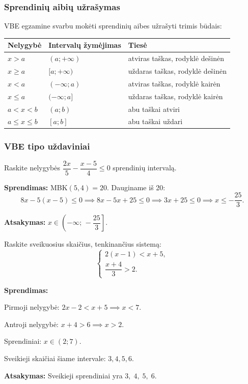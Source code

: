\subsubsection{Sprendinių aibių užrašymas}

VBE egzamine svarbu mokėti sprendinių aibes užrašyti trimis būdais:

\begin{center}
\begin{tabular}{|l|l|l|}
\hline
\textbf{Nelygybė} & \textbf{Intervalų žymėjimas} & \textbf{Tiesė} \\
\hline
$x > a$ & $(a; +\infty)$ & atviras taškas, rodyklė dešinėn \\
$x \geq a$ & $[a; +\infty)$ & uždaras taškas, rodyklė dešinėn \\
$x < a$ & $(-\infty; a)$ & atviras taškas, rodyklė kairėn \\
$x \leq a$ & $(-\infty; a]$ & uždaras taškas, rodyklė kairėn \\
$a < x < b$ & $(a; b)$ & abu taškai atviri \\
$a \leq x \leq b$ & $[a; b]$ & abu taškai uždari \\
\hline
\end{tabular}
\end{center}

\subsubsection{VBE tipo uždaviniai}

\begin{exercise}
Raskite nelygybės $\dfrac{2x}{5} - \dfrac{x - 5}{4} \leq 0$ sprendinių intervalą.

\textbf{Sprendimas:} MBK$(5, 4) = 20$. Dauginame iš 20:
\[
8x - 5(x - 5) \leq 0 \implies 8x - 5x + 25 \leq 0 \implies 3x + 25 \leq 0 \implies x \leq -\frac{25}{3}.
\]

\textbf{Atsakymas:} $x \in \left(-\infty;\, -\dfrac{25}{3}\right]$.
\end{exercise}

\begin{exercise}
Raskite sveikuosius skaičius, tenkinančius sistemą:
\[
\begin{cases}
    2(x - 1) < x + 5, \\
    \dfrac{x + 4}{3} > 2.
\end{cases}
\]

\textbf{Sprendimas:}

Pirmoji nelygybė: $2x - 2 < x + 5 \implies x < 7$.

Antroji nelygybė: $x + 4 > 6 \implies x > 2$.

Sprendiniai: $x \in (2; 7)$.

Sveikieji skaičiai šiame intervale: $3, 4, 5, 6$.

\textbf{Atsakymas:} Sveikieji sprendiniai yra $3,\; 4,\; 5,\; 6$.
\end{exercise}

